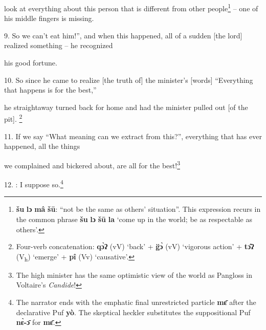 look at everything about this person that is different from other people\footnote{\textbf{šu} \textbf{lɔ} \textbf{mâ} \textbf{šū}: ``not be the same as others' situation''. This expression recurs in the common phrase \textbf{šu} \textbf{lɔ} \textbf{šū} \textbf{la} `come up in the world; be as respectable as others'.} --
one of his middle fingers is missing.

9. So we can't eat him!'', and when this happened, all of a sudden [the lord] realized
something -- he recognized

his good fortune.

10. So since he came to realize [the truth of] the minister's [words] ``Everything
that happens is for the best,''

he straightaway turned back for home and had the minister pulled out [of the pit].
\footnote{Four-verb concatenation: \textbf{qɔ̀ʔ} (vV) `back' + \textbf{g̈ɔ̀} (vV) `vigorous action' + \textbf{tɔ̂ʔ} (V\textsubscript{h}) `emerge' + \textbf{pî} (Vv) `causative'.}

11. If we say ``What meaning can we extract from this?'', everything that has ever
happened, all the things

we complained and bickered about, are all for the best!\footnote{The high minister has the same optimistic view of the world as Pangloss in Voltaire's \textit{Candide}!}

12.  : I suppose so.\footnote{The narrator ends with the emphatic final unrestricted particle \textbf{mɛ̄} after the declarative Puf \textbf{yò}. The skeptical heckler substitutes the suppositional Puf \textbf{nɛ̀-ɔ̄} for \textbf{mɛ̄}.}

